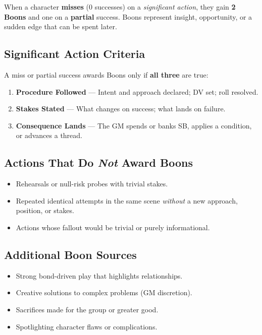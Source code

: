 When a character \textbf{misses} (0 successes) on a \emph{significant action}, they gain \textbf{2 Boons} and one on a \textbf{partial} success. Boons represent insight, opportunity, or a sudden edge that can be spent later.

\subsection{Significant Action Criteria}
\label{subsec:significant-action}

A miss or partial success awards Boons only if \textbf{all three} are true:
\begin{enumerate}
\item \textbf{Procedure Followed} — Intent and approach declared; DV set; roll resolved. 
\item \textbf{Stakes Stated} — What changes on success; what lands on failure. 
\item \textbf{Consequence Lands} — The GM spends or banks SB, applies a condition, or advances a thread. 
\end{enumerate}

\subsection{Actions That Do \emph{Not} Award Boons}
\label{subsec:no-boon-actions}
\begin{itemize}
\item Rehearsals or null-risk probes with trivial stakes.
\item Repeated identical attempts in the same scene \emph{without} a new approach, position, or stakes.
\item Actions whose fallout would be trivial or purely informational.
\end{itemize}

\subsection{Additional Boon Sources}
\label{subsec:other-boon-sources}
\begin{itemize}
\item Strong bond-driven play that highlights relationships.
\item Creative solutions to complex problems (GM discretion).
\item Sacrifices made for the group or greater good.
\item Spotlighting character flaws or complications.
\end{itemize}

